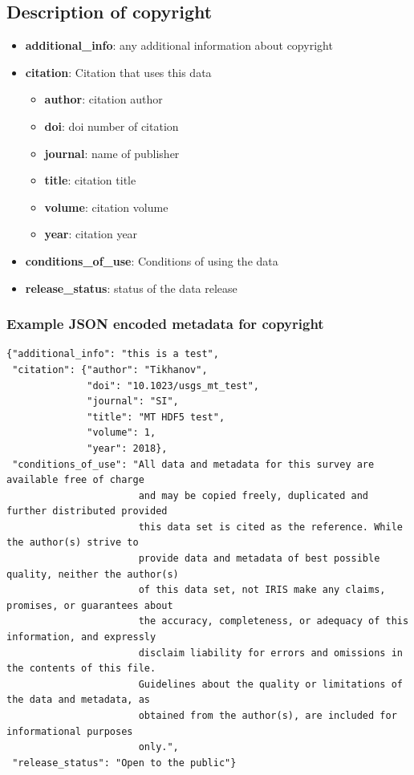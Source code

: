 \documentclass{article}
\newcommand{\attr}[1]{\textbf{#1}}
\begin{document}
\newpage
\subsection{Description of \textbf{copyright}} 

\begin{itemize}
	\setlength{\itemsep}{.05em}
	\item \attr{additional\_info}: any additional information about copyright
	\item \attr{citation}: Citation that uses this data
	\begin{itemize}
		\setlength{\itemsep}{.05em}
		\item \attr{author}: citation author
		\item \attr{doi}: doi number of citation
		\item \attr{journal}: name of publisher
		\item \attr{title}: citation title
		\item \attr{volume}: citation volume
		\item \attr{year}: citation year
	\end{itemize}
	\item \attr{conditions\_of\_use}: Conditions of using the data
	\item \attr{release\_status}: status of the data release
\end{itemize}

\subsubsection{Example JSON encoded metadata for \textbf{copyright}}
\begin{verbatim}
{"additional_info": "this is a test",
 "citation": {"author": "Tikhanov",
              "doi": "10.1023/usgs_mt_test",
              "journal": "SI",
              "title": "MT HDF5 test",
              "volume": 1,
              "year": 2018},
 "conditions_of_use": "All data and metadata for this survey are available free of charge 
                       and may be copied freely, duplicated and further distributed provided
                       this data set is cited as the reference. While the author(s) strive to
                       provide data and metadata of best possible quality, neither the author(s)
                       of this data set, not IRIS make any claims, promises, or guarantees about
                       the accuracy, completeness, or adequacy of this information, and expressly
                       disclaim liability for errors and omissions in the contents of this file.
                       Guidelines about the quality or limitations of the data and metadata, as 
                       obtained from the author(s), are included for informational purposes 
                       only.",
 "release_status": "Open to the public"} 
\end{verbatim}
   
\end{document}
